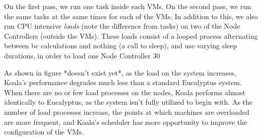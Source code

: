 On the first pass, we run one task inside each VMs.  On the second pass, we run the same tasks at the same times for each of the VMs.  In addition to this, we also run CPU intensive \emph{loads} (note the difference from tasks) on two of the Node Controllers (outside the VMs).  These loads consist of a looped process alternating between bc calculations and nothing (a call to sleep), and use varying sleep durations, in order to load one Node Controller 30%

As shown in figure *doesn't exist yet*, as the load on the system increases, Koala's performance degrades much less than a standard Eucalyptus system.  When there are no or few load processes on the nodes, Koala performs almost identically to Eucalyptus, as the system isn't fully utilized to begin with.  As the number of load processes increase, the points at which machines are overloaded are more frequent, and Koala's scheduler has more opportunity to improve the configuration of the VMs.
